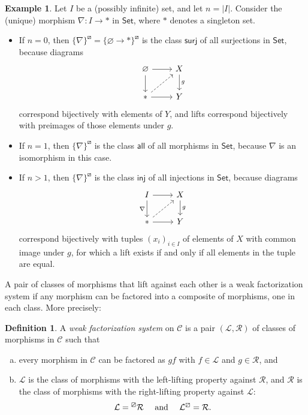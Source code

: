 \documentclass{amsart}
\renewcommand\emptyset\varnothing
\newcommand{\Set}{\mathsf{Set}}
\newcommand{\cat}{\mathcal}
\newcommand{\catC}{\mathcal{C}}
\newcommand{\llp}[1]{\prescript{\boxslash}{}{#1}}
\newcommand{\rlp}[1]{{#1}^{\boxslash}}
\newcommand{\all}{\mathsf{all}}
\newcommand{\inj}{\mathsf{inj}}
\newcommand{\surj}{\mathsf{surj}}
\numberwithin{equation}{section}
\theoremstyle{definition}
\newtheorem{definition}[equation]{Definition}
\newtheorem{example}[equation]{Example}
\begin{document}
\begin{example}
	\label{lifts of folds}
	Let $I$ be a (possibly infinite) set, and let $n = \lvert I \rvert$. Consider the (unique) morphism $\nabla \colon I \to \ast$ in $\Set$, where $\ast$ denotes a singleton set. 
	\begin{itemize}
		\item If $n = 0$, then $\rlp{\{\nabla\}} = \rlp{\big\{\emptyset \to \ast\big\}}$ is the class $\surj$ of all surjections in $\Set$, because diagrams
		      \[
			      \begin{tikzcd}
				      \emptyset \ar[r] \ar[d] & {X} \ar[d, "g"] \\
				      \ast \ar[r] \ar[ur, dashed] & {Y}
			      \end{tikzcd}
		      \]
		      correspond bijectively with elements of $Y$, and lifts correspond bijectively with preimages of those elements under $g$.

		\item If $n = 1$, then $\rlp{\{\nabla\}}$ is the class $\all$ of all morphisms in $\Set$, because $\nabla$ is an isomorphism in this case.

		\item If $n > 1$, then $\rlp{\{\nabla\}}$ is the class $\inj$ of all injections in $\Set$, because diagrams
		      \[
			      \begin{tikzcd}
				      {I} \ar[d, "\nabla"'] \ar[r] & X \ar[d, "g"] \\
				      \ast \ar[r] \ar[ur, dashed] & Y
			      \end{tikzcd}
		      \]
		      correspond bijectively with tuples $(x_i)_{i \in I}$ of elements of $X$ with common image under $g$, for which a lift exists if and only if all elements in the tuple are equal.
	\end{itemize}
\end{example}

A pair of classes of morphisms that lift against each other is a weak factorization system if any morphism can be factored into a composite of morphisms, one in each class. More precisely:

\begin{definition}
	A \emph{weak factorization system} on $\catC$ is a pair $(\cat L, \cat R)$ of classes of morphisms in $\catC$ such that
	\begin{enumerate}[(a)]
		\item every morphism in $\catC$ can be factored as $gf$ with $f \in \cat L$ and $g \in \cat R$, and
		\item $\cat L$ is the class of morphisms with the left-lifting property against $\cat R$, and $\cat R$ is the class of morphisms with the right-lifting property against $\cat L$:
		      \[
			      \cat L = \llp{\cat R}
			      \quad \text{ and } \quad
			      \rlp{\cat L} = \cat R.
		      \]
	\end{enumerate}
\end{definition}
\end{document}
